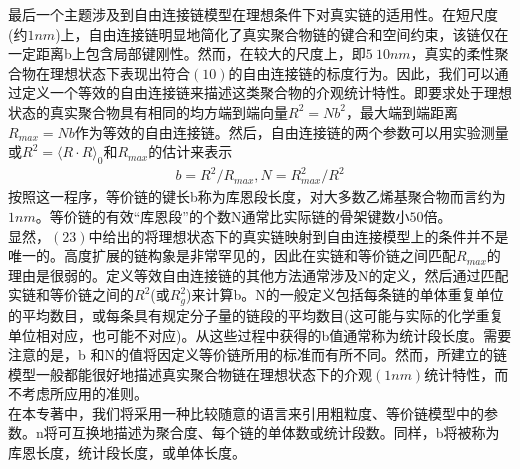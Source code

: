 最后一个主题涉及到自由连接链模型在理想条件下对真实链的适用性。在短尺度(约$1nm$)上，自由连接链明显地简化了真实聚合物链的键合和空间约束，该链仅在一定距离b上包含局部键刚性。然而，在较大的尺度上，即$5~10nm$，真实的柔性聚合物在理想状态下表现出符合$(10)$的自由连接链的标度行为。因此，我们可以通过定义一个等效的自由连接链来描述这类聚合物的介观统计特性。即要求处于理想状态的真实聚合物具有相同的均方端到端向量$R^2=Nb^2$，最大端到端距离$R_{max}=Nb$作为等效的自由连接链。然后，自由连接链的两个参数可以用实验测量或$R^2=\langle R \cdot R\rangle_{0}$和$R_{max}$的估计来表示\\
\begin{gather}
b=R^2/R_{max},N=R_{max}^{2}/R^2
\end{gather}
按照这一程序，等价链的键长b称为库恩段长度，对大多数乙烯基聚合物而言约为$1nm$。等价链的有效“库恩段”的个数N通常比实际链的骨架键数小$50$倍。\\

显然，$(23)$中给出的将理想状态下的真实链映射到自由连接模型上的条件并不是唯一的。高度扩展的链构象是非常罕见的，因此在实链和等价链之间匹配$R_{max}$的理由是很弱的。定义等效自由连接链的其他方法通常涉及N的定义，然后通过匹配实链和等价链之间的$R^2$(或$R_{g}^{2}$)来计算b。N的一般定义包括每条链的单体重复单位的平均数目，或每条具有规定分子量的链段的平均数目(这可能与实际的化学重复单位相对应，也可能不对应)。从这些过程中获得的b值通常称为统计段长度。需要注意的是，b 和N的值将因定义等价链所用的标准而有所不同。然而，所建立的链模型一般都能很好地描述真实聚合物链在理想状态下的介观$(1nm)$统计特性，而不考虑所应用的准则。\\

在本专著中，我们将采用一种比较随意的语言来引用粗粒度、等价链模型中的参数。n将可互换地描述为聚合度、每个链的单体数或统计段数。同样，b将被称为库恩长度，统计段长度，或单体长度。\\
\endinput

